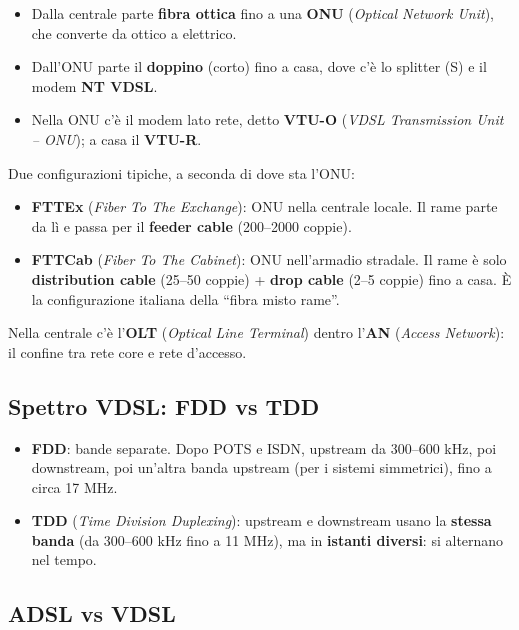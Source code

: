 \begin{itemize}
\tightlist
\item
  Dalla centrale parte \textbf{fibra ottica} fino a una \textbf{ONU} (\emph{Optical Network Unit}), che converte da ottico a elettrico.
\item
  Dall'ONU parte il \textbf{doppino} (corto) fino a casa, dove c'è lo splitter (S) e il modem \textbf{NT VDSL}.
\item
  Nella ONU c'è il modem lato rete, detto \textbf{VTU-O} (\emph{VDSL Transmission Unit -- ONU}); a casa il \textbf{VTU-R}.
\end{itemize}

Due configurazioni tipiche, a seconda di dove sta l'ONU:

\begin{itemize}
\tightlist
\item
  \textbf{FTTEx} (\emph{Fiber To The Exchange}): ONU nella centrale locale. Il rame parte da lì e passa per il \textbf{feeder cable} (200--2000 coppie).
\item
  \textbf{FTTCab} (\emph{Fiber To The Cabinet}): ONU nell'armadio stradale. Il rame è solo \textbf{distribution cable} (25--50 coppie) + \textbf{drop cable} (2--5 coppie) fino a casa. È la configurazione italiana della ``fibra misto rame''.
\end{itemize}

Nella centrale c'è l'\textbf{OLT} (\emph{Optical Line Terminal}) dentro l'\textbf{AN} (\emph{Access Network}): il confine tra rete core e rete d'accesso.

\subsection{Spettro VDSL: FDD vs TDD}

\begin{itemize}
\tightlist
\item
  \textbf{FDD}: bande separate. Dopo POTS e ISDN, upstream da 300--600 kHz, poi downstream, poi un'altra banda upstream (per i sistemi simmetrici), fino a circa 17 MHz.
\item
  \textbf{TDD} (\emph{Time Division Duplexing}): upstream e downstream usano la \textbf{stessa banda} (da 300--600 kHz fino a 11 MHz), ma in \textbf{istanti diversi}: si alternano nel tempo.
\end{itemize}

\subsection{ADSL vs VDSL}

